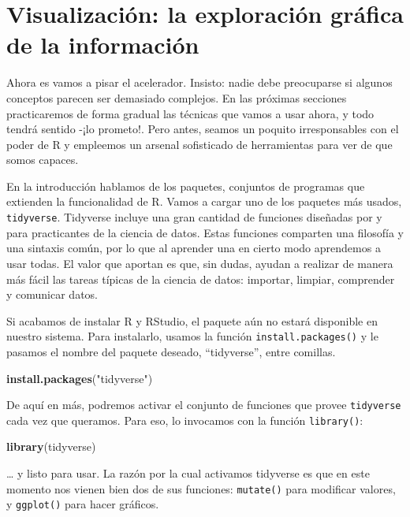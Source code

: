 \documentclass[]{book}
\newenvironment{Shaded}{\begin{snugshade}}{\end{snugshade}}
\newcommand{\KeywordTok}[1]{\textcolor[rgb]{0.13,0.29,0.53}{\textbf{#1}}}
\newcommand{\StringTok}[1]{\textcolor[rgb]{0.31,0.60,0.02}{#1}}
\newcommand{\NormalTok}[1]{#1}
\begin{document}
\section{Visualización: la exploración gráfica de la
información}\label{visualizacion-la-exploracion-grafica-de-la-informacion}

Ahora es vamos a pisar el acelerador. Insisto: nadie debe preocuparse si
algunos conceptos parecen ser demasiado complejos. En las próximas
secciones practicaremos de forma gradual las técnicas que vamos a usar
ahora, y todo tendrá sentido -¡lo prometo!. Pero antes, seamos un
poquito irresponsables con el poder de R y empleemos un arsenal
sofisticado de herramientas para ver de que somos capaces.

En la introducción hablamos de los paquetes, conjuntos de programas que
extienden la funcionalidad de R. Vamos a cargar uno de los paquetes más
usados, \texttt{tidyverse}. Tidyverse incluye una gran cantidad de
funciones diseñadas por y para practicantes de la ciencia de datos.
Estas funciones comparten una filosofía y una sintaxis común, por lo que
al aprender una en cierto modo aprendemos a usar todas. El valor que
aportan es que, sin dudas, ayudan a realizar de manera más fácil las
tareas típicas de la ciencia de datos: importar, limpiar, comprender y
comunicar datos.

Si acabamos de instalar R y RStudio, el paquete aún no estará disponible
en nuestro sistema. Para instalarlo, usamos la función
\texttt{install.packages()} y le pasamos el nombre del paquete deseado,
``tidyverse'', entre comillas.

\begin{Shaded}
\begin{Highlighting}[]
\KeywordTok{install.packages}\NormalTok{(}\StringTok{"tidyverse"}\NormalTok{)}
\end{Highlighting}
\end{Shaded}

De aquí en más, podremos activar el conjunto de funciones que provee
\texttt{tidyverse} cada vez que queramos. Para eso, lo invocamos con la
función \texttt{library()}:

\begin{Shaded}
\begin{Highlighting}[]
\KeywordTok{library}\NormalTok{(tidyverse)}
\end{Highlighting}
\end{Shaded}

\ldots{} y listo para usar. La razón por la cual activamos tidyverse es
que en este momento nos vienen bien dos de sus funciones:
\texttt{mutate()} para modificar valores, y \texttt{ggplot()} para hacer
gráficos.
\end{document}
